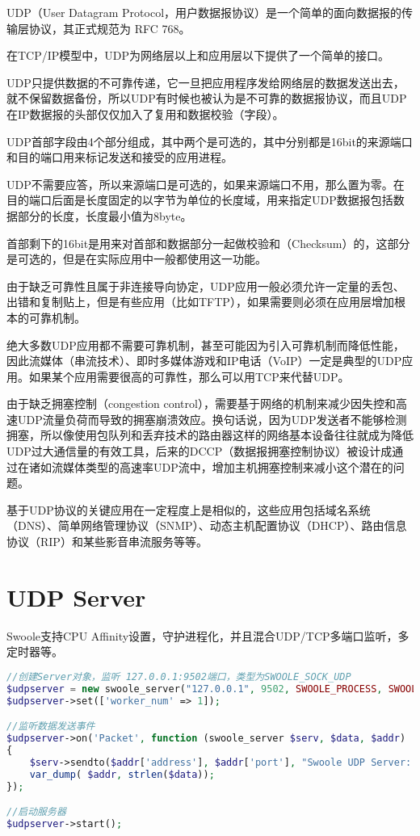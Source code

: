 UDP（User Datagram Protocol，用户数据报协议）是一个简单的面向数据报的传输层协议，其正式规范为 RFC 768。

在TCP/IP模型中，UDP为网络层以上和应用层以下提供了一个简单的接口。

UDP只提供数据的不可靠传递，它一旦把应用程序发给网络层的数据发送出去，就不保留数据备份，所以UDP有时候也被认为是不可靠的数据报协议，而且UDP在IP数据报的头部仅仅加入了复用和数据校验（字段）。

UDP首部字段由4个部分组成，其中两个是可选的，其中分别都是16bit的来源端口和目的端口用来标记发送和接受的应用进程。

UDP不需要应答，所以来源端口是可选的，如果来源端口不用，那么置为零。在目的端口后面是长度固定的以字节为单位的长度域，用来指定UDP数据报包括数据部分的长度，长度最小值为8byte。

首部剩下的16bit是用来对首部和数据部分一起做校验和（Checksum）的，这部分是可选的，但是在实际应用中一般都使用这一功能。

由于缺乏可靠性且属于非连接导向协定，UDP应用一般必须允许一定量的丢包、出错和复制贴上，但是有些应用（比如TFTP），如果需要则必须在应用层增加根本的可靠机制。

绝大多数UDP应用都不需要可靠机制，甚至可能因为引入可靠机制而降低性能，因此流媒体（串流技术）、即时多媒体游戏和IP电话（VoIP）一定是典型的UDP应用。如果某个应用需要很高的可靠性，那么可以用TCP来代替UDP。

由于缺乏拥塞控制（congestion control），需要基于网络的机制来减少因失控和高速UDP流量负荷而导致的拥塞崩溃效应。换句话说，因为UDP发送者不能够检测拥塞，所以像使用包队列和丢弃技术的路由器这样的网络基本设备往往就成为降低UDP过大通信量的有效工具，后来的DCCP（数据报拥塞控制协议）被设计成通过在诸如流媒体类型的高速率UDP流中，增加主机拥塞控制来减小这个潜在的问题。

基于UDP协议的关键应用在一定程度上是相似的，这些应用包括域名系统（DNS）、简单网络管理协议（SNMP）、动态主机配置协议（DHCP）、路由信息协议（RIP）和某些影音串流服务等等。


\section{UDP Server}

Swoole支持CPU Affinity设置，守护进程化，并且混合UDP/TCP多端口监听，多定时器等。

\begin{lstlisting}[language=PHP]
//创建Server对象，监听 127.0.0.1:9502端口，类型为SWOOLE_SOCK_UDP
$udpserver = new swoole_server("127.0.0.1", 9502, SWOOLE_PROCESS, SWOOLE_SOCK_UDP); 
$udpserver->set(['worker_num' => 1]);

//监听数据发送事件
$udpserver->on('Packet', function (swoole_server $serv, $data, $addr)
{
    $serv->sendto($addr['address'], $addr['port'], "Swoole UDP Server: $data" );
    var_dump( $addr, strlen($data));
});

//启动服务器
$udpserver->start(); 
\end{lstlisting}

